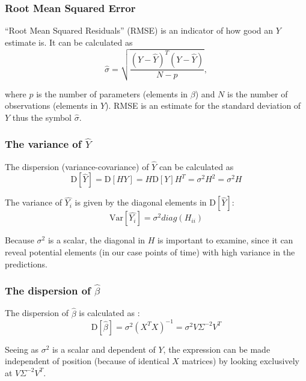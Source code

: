 \subsubsection{Root Mean Squared Error}

``Root Mean Squared Residuals'' (RMSE) is an indicator of how good an $Y$ estimate is.
It can be calculated as
\begin{equation}
\hat{\sigma} = \sqrt{\frac{\left(Y - \hat{Y}\right)^T \left(Y - \hat{Y}\right)}{N-p}},
\end{equation}

where $p$ is the number of parameters (elements in $\beta$) and $N$ is the number of observations (elements in $Y$).
RMSE is an estimate for the standard deviation of $Y$ \cite[theorem~3.4]{time-series-analysis} thus the symbol $\hat{\sigma}$.


\subsubsection{The variance of $\hat{Y}$}

The dispersion (variance-covariance) of $\hat{Y}$ can be calculated as
\begin{equation}
\mathrm{D}[\hat{Y}] = \mathrm{D}[H Y] = H \mathrm{D}[Y] H^T = \sigma^2 H^2 = \sigma^2 H
\end{equation}

The variance of $\hat{Y_i}$ is given by the diagonal elements in $\mathrm{D}[\hat{Y}]$:
\begin{equation}
\mathrm{Var}[\hat{Y_i}] = \sigma^2 diag(H_{ii})
\end{equation}

Because $\sigma^2$ is a scalar, the diagonal in $H$ is important to examine, since it can reveal potential elements (in our case points of time) with high variance in the predictions.

\subsubsection{The dispersion of $\hat{\beta}$}

The dispersion of $\hat{\beta}$ is calculated as \cite[theorem~3.2]{time-series-analysis}:
\begin{equation}
\mathrm{D}[\hat{\beta}] = \sigma^2 (X^T X)^{-1} = \sigma^2 V \Sigma^{-2} V^T
\end{equation}

Seeing as $\sigma^2$ is a scalar and dependent of $Y$, the expression can be made independent of position (because of identical $X$ matrices) by looking exclusively at $V \Sigma^{-2} V^T$.

